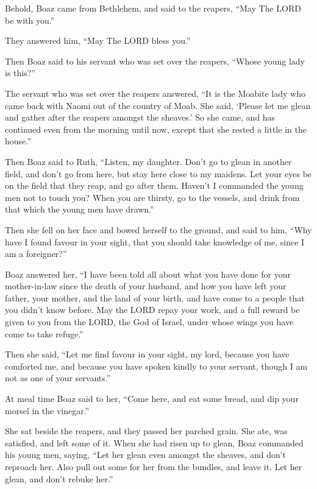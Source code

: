 Behold, Boaz came from Bethlehem, and said to the
reapers, ``May The LORD be with you.''

They answered him, ``May The LORD bless you.''

 Then Boaz said to his servant who was set over the
reapers, ``Whose young lady is this?''

 The servant who was set over the reapers answered, ``It
is the Moabite lady who came back with Naomi out of the country of Moab.
 She said, `Please let me glean and gather after the
reapers amongst the sheaves.' So she came, and has continued even from
the morning until now, except that she rested a little in the house.''

 Then Boaz said to Ruth, ``Listen, my daughter. Don't go
to glean in another field, and don't go from here, but stay here close
to my maidens.  Let your eyes be on the field that they
reap, and go after them. Haven't I commanded the young men not to touch
you? When you are thirsty, go to the vessels, and drink from that which
the young men have drawn.''

 Then she fell on her face and bowed herself to the
ground, and said to him, ``Why have I found favour in your sight, that
you should take knowledge of me, since I am a foreigner?''

 Boaz answered her, ``I have been told all about what you
have done for your mother-in-law since the death of your husband, and
how you have left your father, your mother, and the land of your birth,
and have come to a people that you didn't know before. 
May the LORD repay your work, and a full reward be given to you from the
LORD, the God of Israel, under whose wings you have come to take
refuge.''

 Then she said, ``Let me find favour in your sight, my
lord, because you have comforted me, and because you have spoken kindly
to your servant, though I am not as one of your servants.''

 At meal time Boaz said to her, ``Come here, and eat some
bread, and dip your morsel in the vinegar.''

She sat beside the reapers, and they passed her parched grain. She ate,
was satisfied, and left some of it.  When she had risen
up to glean, Boaz commanded his young men, saying, ``Let her glean even
amongst the sheaves, and don't reproach her.  Also pull
out some for her from the bundles, and leave it. Let her glean, and
don't rebuke her.''

